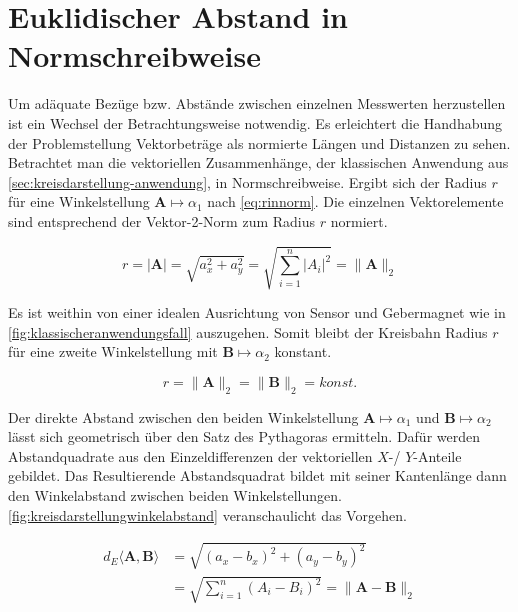 %

\section{Euklidischer Abstand in Normschreibweise}\label{sec:euklidischer-abstand}


Um adäquate Bezüge bzw. Abstände zwischen einzelnen Messwerten herzustellen ist ein Wechsel der Betrachtungsweise notwendig. Es erleichtert die Handhabung der Problemstellung Vektorbeträge als normierte Längen und Distanzen zu sehen. Betrachtet man die vektoriellen Zusammenhänge, der klassischen Anwendung aus \autoref{sec:kreisdarstellung-anwendung}, in Normschreibweise. Ergibt sich der Radius $r$ für eine Winkelstellung $\mathbf{A}\mapsto\alpha_1$ nach \autoref{eq:rinnorm}. Die einzelnen Vektorelemente sind entsprechend der Vektor-2-Norm \cite{vandeGeijn2014} zum Radius $r$ normiert.


\begin{equation}\label{eq:rinnorm}
r = |\mathbf{A}| =\sqrt{a_x^2 + a_y^2} = \sqrt{\sum_{i=1}^{n}|A_i|^2} = \|\mathbf{A}\|_2
\end{equation}


Es ist weithin von einer idealen Ausrichtung von Sensor und Gebermagnet wie in \autoref{fig:klassischeranwendungsfall} auszugehen. Somit bleibt der Kreisbahn Radius $r$ für eine zweite Winkelstellung mit $\mathbf{B}\mapsto\alpha_2$ konstant.


\begin{equation}
r = \|\mathbf{A}\|_2 = \|\mathbf{B}\|_2 = konst.
\end{equation}


Der direkte Abstand zwischen den beiden Winkelstellung $\mathbf{A}\mapsto\alpha_1$ und $\mathbf{B}\mapsto\alpha_2$ lässt sich geometrisch über den Satz des Pythagoras ermitteln. Dafür werden Abstandquadrate aus den Einzeldifferenzen der vektoriellen $X$-/ $Y$-Anteile gebildet. Das Resultierende Abstandsquadrat bildet mit seiner Kantenlänge dann den Winkelabstand zwischen beiden Winkelstellungen. \autoref{fig:kreisdarstellungwinkelabstand} veranschaulicht das Vorgehen.


\begin{align}\label{eq:deinnorm}
d_E\langle\mathbf{A},\mathbf{B}\rangle &= \sqrt{(a_x - b_x)^2 + (a_y - b_y)^2} \nonumber \\
&= \sqrt{\sum_{i=1}^{n}(A_i - B_i)^2} = \|\mathbf{A} - \mathbf{B}\|_2
\end{align}


